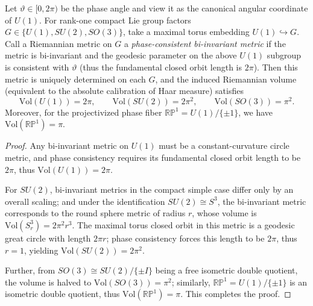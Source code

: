 \begin{proposition}\label{prop:phase-gate-rank1-volume-rigidity}
Let \(\vartheta\in[0,2\pi)\) be the phase angle and view it as the canonical angular coordinate of \(U(1)\).
For rank-one compact Lie group factors \(G\in\{U(1),SU(2),SO(3)\}\), take a maximal torus embedding \(U(1)\hookrightarrow G\).
Call a Riemannian metric on \(G\) a \emph{phase-consistent bi-invariant metric} if the metric is bi-invariant and the geodesic parameter on the above \(U(1)\) subgroup is consistent with \(\vartheta\) (thus the fundamental closed orbit length is \(2\pi\)).
Then this metric is uniquely determined on each \(G\), and the induced Riemannian volume (equivalent to the absolute calibration of Haar measure) satisfies
\[
\mathrm{Vol}(U(1))=2\pi,\qquad
\mathrm{Vol}(SU(2))=2\pi^{2},\qquad
\mathrm{Vol}(SO(3))=\pi^{2}.
\]
Moreover, for the projectivized phase fiber \(\mathbb{RP}^{1}=U(1)/\{\pm 1\}\), we have \(\mathrm{Vol}(\mathbb{RP}^{1})=\pi\).
\end{proposition}
\begin{proof}
Any bi-invariant metric on \(U(1)\) must be a constant-curvature circle metric, and phase consistency requires its fundamental closed orbit length to be \(2\pi\), thus \(\mathrm{Vol}(U(1))=2\pi\).
\par
For \(SU(2)\), bi-invariant metrics in the compact simple case differ only by an overall scaling; and under the identification \(SU(2)\cong S^{3}\), the bi-invariant metric corresponds to the round sphere metric of radius \(r\), whose volume is \(\mathrm{Vol}(S^{3}_{r})=2\pi^{2}r^{3}\).
The maximal torus closed orbit in this metric is a geodesic great circle with length \(2\pi r\); phase consistency forces this length to be \(2\pi\), thus \(r=1\), yielding \(\mathrm{Vol}(SU(2))=2\pi^{2}\).
\par
Further, from \(SO(3)\cong SU(2)/\{\pm I\}\) being a free isometric double quotient, the volume is halved to \(\mathrm{Vol}(SO(3))=\pi^{2}\); similarly, \(\mathbb{RP}^{1}=U(1)/\{\pm 1\}\) is an isometric double quotient, thus \(\mathrm{Vol}(\mathbb{RP}^{1})=\pi\). This completes the proof.
\end{proof}


